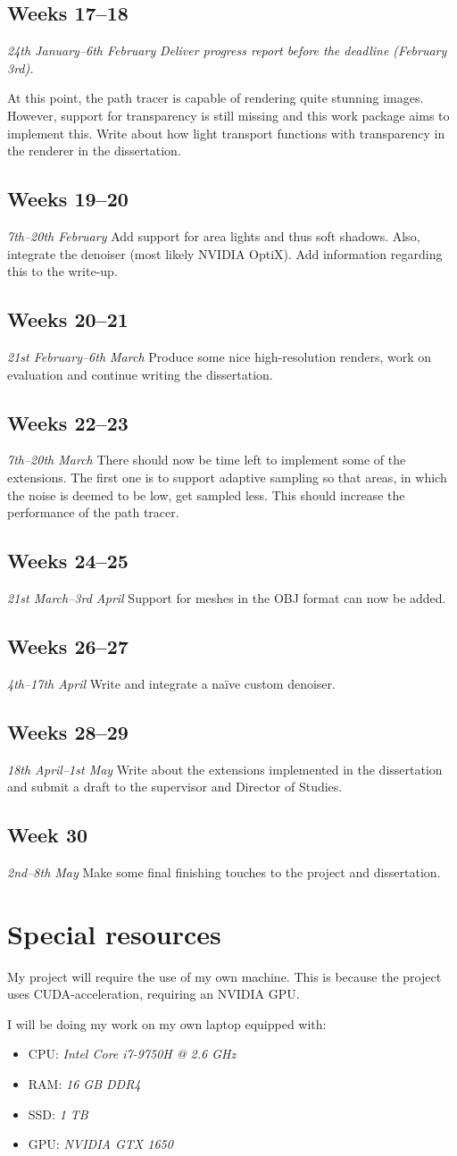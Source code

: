 \documentclass[12pt, a4paper]{article}
\newcommand{\newtime}[3]{
    \subsection*{#1}
    \vspace{-\baselineskip}
    \emph{#2}
    \vspace{\baselineskip}
    \newline
    #3
}
\begin{document}
    \newtime{Weeks 17--18}{24th January--6th February}{\emph{Deliver progress report before the deadline (February 3rd).}
    
    At this point, the path tracer is capable of rendering quite stunning images. However, support for transparency is still missing and this work package aims to implement this. Write about how light transport functions with transparency in the renderer in the dissertation.}

    \newtime{Weeks 19--20}{7th--20th February}{Add support for area lights and thus soft shadows. Also, integrate the denoiser (most likely NVIDIA OptiX). Add information regarding this to the write-up.}

    \newtime{Weeks 20--21}{21st February--6th March}{Produce some nice high-resolution renders, work on evaluation and continue writing the dissertation.}

    \newtime{Weeks 22--23}{7th--20th March}{There should now be time left to implement some of the extensions. The first one is to support adaptive sampling so that areas, in which the noise is deemed to be low, get sampled less. This should increase the performance of the path tracer.}
    
    \newtime{Weeks 24--25}{21st March--3rd April}{Support for meshes in the OBJ format can now be added.}

    \newtime{Weeks 26--27}{4th--17th April}{Write and integrate a naïve custom denoiser.}

    \newtime{Weeks 28--29}{18th April--1st May}{Write about the extensions implemented in the dissertation and submit a draft to the supervisor and Director of Studies.}

    \newtime{Week 30}{2nd--8th May}{Make some final finishing touches to the project and dissertation.}

    \section*{Special resources}
    My project will require the use of my own machine. This is because the project uses CUDA-acceleration, requiring an NVIDIA GPU.

    I will be doing my work on my own laptop equipped with:
    \begin{itemize}
        \setlength\itemsep{0.1em}
        \item CPU: \emph{Intel Core i7-9750H @ 2.6 GHz}
        \item RAM: \emph{16 GB DDR4}
        \item SSD: \emph{1 TB}
        \item GPU: \emph{NVIDIA GTX 1650}
    \end{itemize}
    
\end{document}
